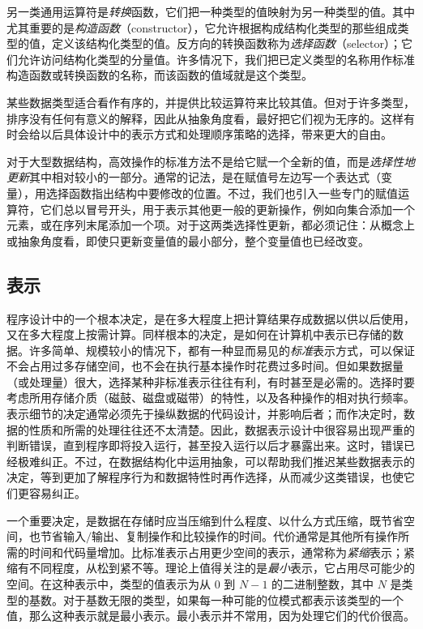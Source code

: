 \documentclass[twoside,11pt,fontset=none]{ctexbook}
\begin{document}
另一类通用运算符是\textit{转换}函数，它们把一种类型的值映射为另一种类型的值。其中尤其重要的是\textit{构造函数}（constructor），它允许根据构成结构化类型的那些组成类型的值，定义该结构化类型的值。反方向的转换函数称为\textit{选择函数}（selector）；它们允许访问结构化类型的分量值。许多情况下，我们把已定义类型的名称用作标准构造函数或转换函数的名称，而该函数的值域就是这个类型。

某些数据类型适合看作有序的，并提供比较运算符来比较其值。但对于许多类型，排序没有任何有意义的解释，因此从抽象角度看，最好把它们视为无序的。这样有时会给以后具体设计中的表示方式和处理顺序策略的选择，带来更大的自由。

对于大型数据结构，高效操作的标准方法不是给它赋一个全新的值，而是\textit{选择性地更新}其中相对较小的一部分。通常的记法，是在赋值号左边写一个表达式（变量），用选择函数指出结构中要修改的位置。不过，我们也引入一些专门的赋值运算符，它们总以冒号开头，用于表示其他更一般的更新操作，例如向集合添加一个元素，或在序列末尾添加一个项。对于这两类选择性更新，都必须记住：从概念上或抽象角度看，即使只更新变量值的最小部分，整个变量值也已经改变。

\subsection{表示}

程序设计中的一个根本决定，是在多大程度上把计算结果存成数据以供以后使用，又在多大程度上按需计算。同样根本的决定，是如何在计算机中表示已存储的数据。许多简单、规模较小的情况下，都有一种显而易见的\textit{标准}表示方式，可以保证不会占用过多存储空间，也不会在执行基本操作时花费过多时间。但如果数据量（或处理量）很大，选择某种非标准表示往往有利，有时甚至是必需的。选择时要考虑所用存储介质（磁鼓、磁盘或磁带）的特性，以及各种操作的相对执行频率。表示细节的决定通常必须先于操纵数据的代码设计，并影响后者；而作决定时，数据的性质和所需的处理往往还不太清楚。因此，数据表示设计中很容易出现严重的判断错误，直到程序即将投入运行，甚至投入运行以后才暴露出来。这时，错误已经极难纠正。不过，在数据结构化中运用抽象，可以帮助我们推迟某些数据表示的决定，等到更加了解程序行为和数据特性时再作选择，从而减少这类错误，也使它们更容易纠正。

一个重要决定，是数据在存储时应当压缩到什么程度、以什么方式压缩，既节省空间，也节省输入$/$输出、复制操作和比较操作的时间。代价通常是其他所有操作所需的时间和代码量增加。比标准表示占用更少空间的表示，通常称为\textit{紧缩}表示；紧缩有不同程度，从松到紧不等。理论上值得关注的是\textit{最小}表示，它占用尽可能少的空间。在这种表示中，类型的值表示为从 0 到 $N - 1$ 的二进制整数，其中 $N$ 是类型的基数。对于基数无限的类型，如果每一种可能的位模式都表示该类型的一个值，那么这种表示就是最小表示。最小表示并不常用，因为处理它们的代价很高。
\end{document}

